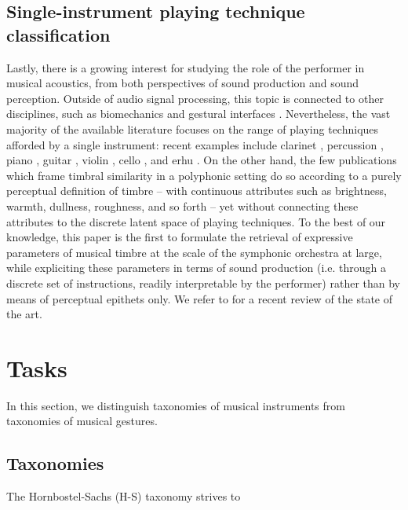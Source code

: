 \documentclass{article}
\makeatletter
\newcommand*{\ie}{i.e.\@\xspace}
\makeatother
\begin{document}
\subsection{Single-instrument playing technique classification}
Lastly, there is a growing interest for studying the role of the performer in musical acoustics, from both perspectives of sound production and sound perception.
Outside of audio signal processing, this topic is connected to other disciplines, such as biomechanics and gestural interfaces \cite{metcalf2014frontiers}.
Nevertheless, the vast majority of the available literature focuses on the range of playing techniques afforded by a single instrument: recent examples include clarinet \cite{loureiro2004ismir}, percussion \cite{tindale2004ismir}, piano \cite{bernays2013smc}, guitar \cite{foulon2013cmmr,su2014ismir,chen2015ismir}, violin \cite{young2008nime}, cello \cite[chapter 6]{chudy2016phd}, and erhu \cite{yang2014fma}.
On the other hand, the few publications which frame timbral similarity in a polyphonic setting do so according to a purely perceptual definition of timbre -- with continuous attributes such as brightness, warmth, dullness, roughness, and so forth \cite{antoine2018isma} -- yet without connecting these attributes to the discrete latent space of playing techniques.
To the best of our knowledge, this paper is the first to formulate the retrieval of expressive parameters of musical timbre at the scale of the symphonic orchestra at large, while expliciting these parameters in terms of sound production (\ie{} through a discrete set of instructions, readily interpretable by the performer) rather than by means of perceptual epithets only.
We refer to \cite{leman2017chapter} for a recent review of the state of the art.



\section{Tasks}
In this section, we distinguish taxonomies of musical instruments from taxonomies of musical gestures.

\subsection{Taxonomies}
The Hornbostel-Sachs (H-S) taxonomy strives to 
\end{document}
